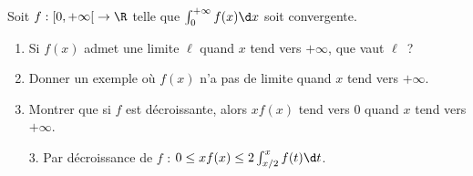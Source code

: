 \begin{enonce}
\begin{exercise}[ID={RMS124 E678 Mines-Ponts PSI},subtitle={2013 Mines-Ponts PSI},tags={}, difficulty={0}]
Soit $f:\left[0,+\infty\right[\to\R$ telle que $\int_0^{+\infty} f(x)\d x$ soit convergente.
\begin{enumerate}
  \item Si $f(x)$ admet une limite $\ell$ quand $x$ tend vers $+\infty$, que vaut $\ell$~?
  \item Donner un exemple où $f(x)$ n'a pas de limite quand $x$ tend vers $+\infty$.
  \item Montrer que si $f$ est décroissante, alors $xf(x)$ tend vers $0$ quand $x$ tend vers $+\infty$.
\end{enumerate}
\end{exercise}
\begin{solution}
\begin{itemize}
\item[3.] Par décroissance de $f$ : $0 \leq x f(x) \leq 2 \int_{x/2}^x f(t)\d t$.
\end{itemize}
\end{solution}
\end{enonce}
